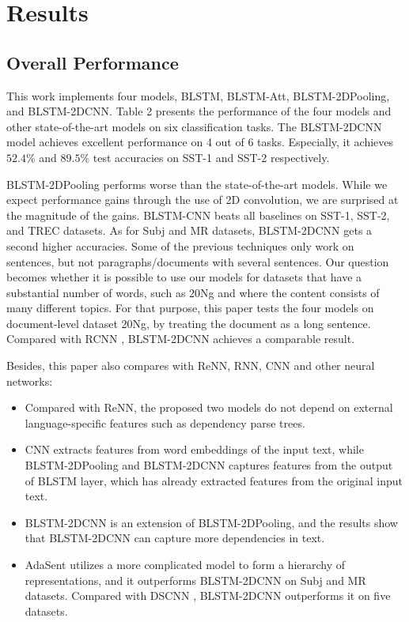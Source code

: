 \documentclass[11pt]{article}
\begin{document}
\section{Results}
\subsection{Overall Performance}
This work implements four models, BLSTM, BLSTM-Att, BLSTM-2DPooling, and BLSTM-2DCNN. Table 2 presents the performance of the four models and other state-of-the-art models on six classification tasks. The BLSTM-2DCNN model achieves excellent performance on 4 out of 6 tasks. Especially, it achieves $52.4\%$ and $89.5\%$ test accuracies on SST-1 and SST-2 respectively.




BLSTM-2DPooling performs worse than the state-of-the-art models. While we expect performance gains through the use of 2D convolution, we are surprised at the magnitude of the gains. BLSTM-CNN beats all baselines on SST-1, SST-2, and TREC datasets. As for Subj and MR datasets, BLSTM-2DCNN gets a second higher accuracies. 
Some of the previous techniques only work on sentences, but not paragraphs/documents with several sentences. Our question becomes whether it is possible to use our models for datasets that have a substantial number of words, such as 20Ng and where the content consists of many different topics. For that purpose, this paper tests the four models on document-level dataset 20Ng, by treating the document as a long sentence. Compared with RCNN \cite{lai2015recurrent}, BLSTM-2DCNN achieves a comparable result.

Besides, this paper also compares with ReNN, RNN, CNN and other neural networks:
\begin{itemize}
\item{Compared with ReNN, the proposed two models do not depend on  external language-specific features such as dependency parse trees.}

\item{CNN extracts features from word embeddings of the input text, while BLSTM-2DPooling and BLSTM-2DCNN captures features from the output of BLSTM layer, which has already extracted features from the original input text.}

\item{BLSTM-2DCNN is an extension of BLSTM-2DPooling, and the results show that BLSTM-2DCNN can capture more dependencies in text.}

\item{AdaSent utilizes a more complicated model to form a hierarchy of representations, and it outperforms BLSTM-2DCNN on Subj and MR datasets. Compared with DSCNN \cite{zhang2016dependency}, BLSTM-2DCNN outperforms it on five datasets.}
\end{itemize}
 
\end{document}
